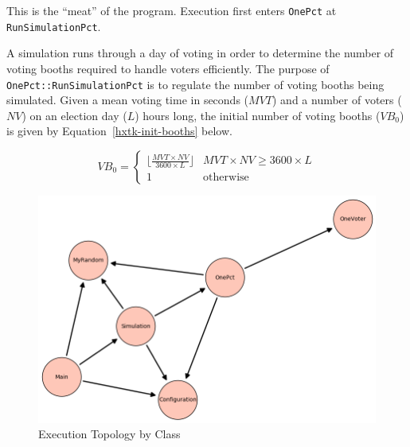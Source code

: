 This is the ``meat'' of the program. Execution first enters \texttt{OnePct} at \texttt{RunSimulationPct}.

A simulation runs through a day of voting in order to determine the number of voting booths required to handle voters efficiently. The purpose of \texttt{OnePct::RunSimulationPct} is to regulate the number of voting booths being simulated. Given a mean voting time in seconds ($MVT$) and a number of voters ($NV$) on an election day ($L$) hours long, the initial number of voting booths ($VB_0$) is given by Equation~\ref{hxtk-init-booths} below.

\begin{equation} \label{hxtk-init-booths}
VB_0 = \begin{cases}
  \lfloor \frac{MVT \times NV}{3600\times L} \rfloor & MVT \times NV \ge 3600\times L \\
  1 & \text{otherwise}
\end{cases}
\end{equation}

\begin{figure}
\begin{center}
\includegraphics[width=\textwidth]{execution_topology}
\end{center}
\caption{Execution Topology by Class} \label{hxtk-exec-topology}
\end{figure}